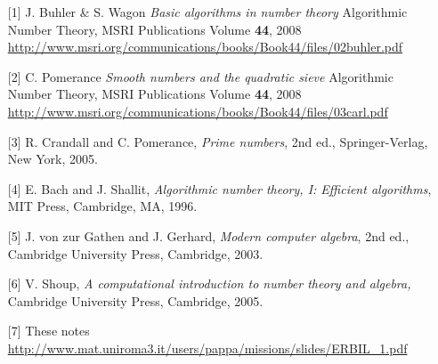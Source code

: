 \documentclass[landscape]{powersem} %
\newcommand{\heading}[1]{%
 \begin{center}
  \Ovalbox{{#1}}%
 \end{center}
 \vspace{1ex minus 1ex}}
\begin{document}
\begin{slide}%
\heading{\textcolor{red}{References}}
\vspace*{-2mm}
\small{\begin{itemize}
 \item[\mbox{[1]}] J. Buhler \& S. Wagon \textit{Basic algorithms in number theory} Algorithmic Number Theory,
MSRI Publications
Volume \textbf{44}, 2008
\hfill {\scriptsize \url{http://www.msri.org/communications/books/Book44/files/02buhler.pdf}
}
\item[\mbox{[2]}] C. Pomerance \textit{Smooth numbers and the quadratic sieve}
Algorithmic Number Theory,
MSRI Publications
Volume \textbf{44}, 2008
\hfill {\scriptsize \url{http://www.msri.org/communications/books/Book44/files/03carl.pdf}
}
\item[\mbox{[3]}] R. Crandall and C. Pomerance, \textit{Prime numbers}, 2nd
ed., Springer-Verlag, New York, 2005.
\item[\mbox{[4]}] E. Bach and J. Shallit, \textit{Algorithmic number theory, I: Efficient
algorithms}, MIT Press, Cambridge, MA, 1996.
\item[\mbox{[5]}] J. von zur Gathen and J. Gerhard, \textit{Modern computer
algebra}, 2nd ed., Cambridge University Press, Cambridge, 2003.
\item[\mbox{[6]}] V. Shoup, \textit{A computational introduction to number theory and algebra,}
Cambridge University Press, Cambridge, 2005.
\item[\mbox{[7]}] 
These notes  
\hfill {\scriptsize \url{http://www.mat.uniroma3.it/users/pappa/missions/slides/ERBIL_1.pdf}
}
\end{itemize}}\vspace*{-2mm}
\end{slide}
\end{document}
